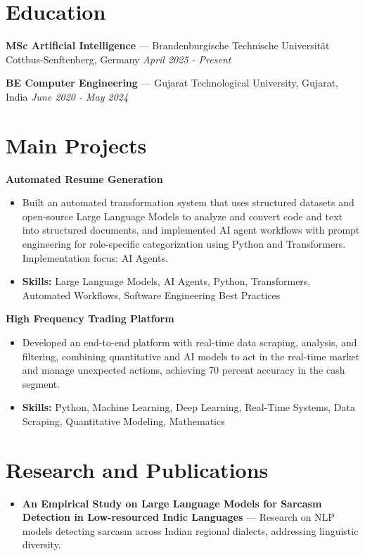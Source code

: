 \documentclass[a4paper,10pt]{article}
\begin{document}
\section*{Education}
\textbf{MSc Artificial Intelligence} — Brandenburgische Technische Universität Cottbus-Senftenberg, Germany \hfill \textit{April 2025 - Present}\par
\vspace{1.5pt}
\textbf{BE Computer Engineering} — Gujarat Technological University, Gujarat, India \hfill \textit{June 2020 - May 2024}\par

\section*{Main Projects}
\textbf{Automated Resume Generation}\par
\vspace{1pt}
\begin{itemize}
  \item Built an automated transformation system that uses structured datasets and open-source Large Language Models to analyze and convert code and text into structured documents, and implemented AI agent workflows with prompt engineering for role-specific categorization using Python and Transformers. Implementation focus: AI Agents.
  \item \textbf{Skills:} Large Language Models, AI Agents, Python, Transformers, Automated Workflows, Software Engineering Best Practices
\end{itemize}
\vspace{3pt}
\textbf{High Frequency Trading Platform}\par
\vspace{1pt}
\begin{itemize}
  \item Developed an end-to-end platform with real-time data scraping, analysis, and filtering, combining quantitative and AI models to act in the real-time market and manage unexpected actions, achieving 70 percent accuracy in the cash segment.
  \item \textbf{Skills:} Python, Machine Learning, Deep Learning, Real-Time Systems, Data Scraping, Quantitative Modeling, Mathematics
\end{itemize}

\section*{Research and Publications}
\begin{itemize}
\item \textbf{An Empirical Study on Large Language Models for Sarcasm Detection in Low-resourced Indic Languages} — Research on NLP models detecting sarcasm across Indian regional dialects, addressing linguistic diversity.
\end{itemize}
\end{document}
